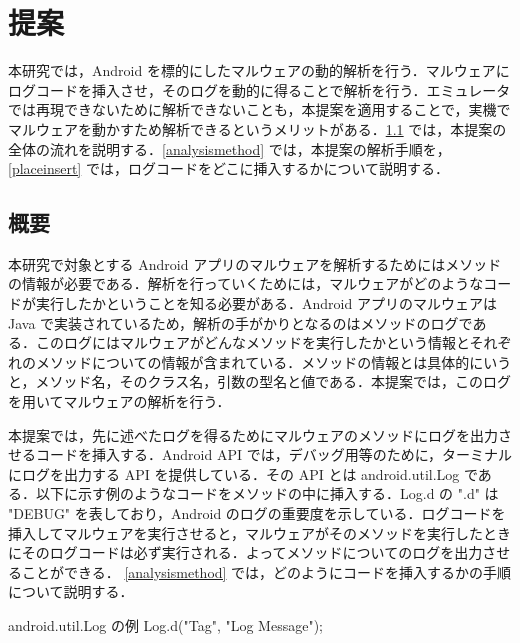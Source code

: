 \section{提案}
本研究では，Android を標的にしたマルウェアの動的解析を行う．マルウェアにログコードを挿入させ，そのログを動的に得ることで解析を行う．エミュレータでは再現できないために解析できないことも，本提案を適用することで，実機でマルウェアを動かすため解析できるというメリットがある．\ref{overview} では，本提案の全体の流れを説明する．\ref{analysismethod} では，本提案の解析手順を，\ref{placeinsert} では，ログコードをどこに挿入するかについて説明する．

\subsection{概要}
\label{overview}
本研究で対象とする Android アプリのマルウェアを解析するためにはメソッドの情報が必要である．解析を行っていくためには，マルウェアがどのようなコードが実行したかということを知る必要がある．Android アプリのマルウェアは Java で実装されているため，解析の手がかりとなるのはメソッドのログである．このログにはマルウェアがどんなメソッドを実行したかという情報とそれぞれのメソッドについての情報が含まれている．メソッドの情報とは具体的にいうと，メソッド名，そのクラス名，引数の型名と値である．本提案では，このログを用いてマルウェアの解析を行う．

本提案では，先に述べたログを得るためにマルウェアのメソッドにログを出力させるコードを挿入する．Android API では，デバッグ用等のために，ターミナルにログを出力する API を提供している．その API とは android.util.Log である．以下に示す例のようなコードをメソッドの中に挿入する．Log.d の ".d" は "DEBUG" を表しており，Android のログの重要度を示している．ログコードを挿入してマルウェアを実行させると，マルウェアがそのメソッドを実行したときにそのログコードは必ず実行される．よってメソッドについてのログを出力させることができる． \ref{analysismethod} では，どのようにコードを挿入するかの手順について説明する．

\begin{itembox}[l]{android.util.Log の例}
	Log.d("Tag", "Log Message");
\end{itembox}

